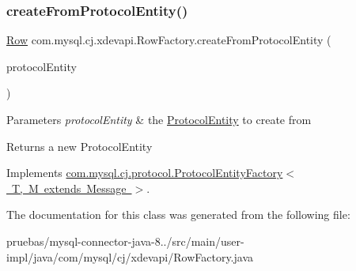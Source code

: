 \subsubsection{\texorpdfstring{create\+From\+Protocol\+Entity()}{createFromProtocolEntity()}}
{\footnotesize\ttfamily \mbox{\hyperlink{interfacecom_1_1mysql_1_1cj_1_1result_1_1_row}{Row}} com.\+mysql.\+cj.\+xdevapi.\+Row\+Factory.\+create\+From\+Protocol\+Entity (\begin{DoxyParamCaption}\item[{\mbox{\hyperlink{interfacecom_1_1mysql_1_1cj_1_1protocol_1_1_protocol_entity}{Protocol\+Entity}}}]{protocol\+Entity }\end{DoxyParamCaption})}


\begin{DoxyParams}{Parameters}
{\em protocol\+Entity} & the \mbox{\hyperlink{}{Protocol\+Entity}} to create from \\
\hline
\end{DoxyParams}
\begin{DoxyReturn}{Returns}
a new Protocol\+Entity 
\end{DoxyReturn}


Implements \mbox{\hyperlink{interfacecom_1_1mysql_1_1cj_1_1protocol_1_1_protocol_entity_factory_a282b14fecc86c7202cd9361333235ef8}{com.\+mysql.\+cj.\+protocol.\+Protocol\+Entity\+Factory$<$ T, M extends Message $>$}}.



The documentation for this class was generated from the following file\+:\begin{DoxyCompactItemize}
\item 
pruebas/mysql-\/connector-\/java-\/8../src/main/user-\/impl/java/com/mysql/cj/xdevapi/Row\+Factory.\+java\end{DoxyCompactItemize}
